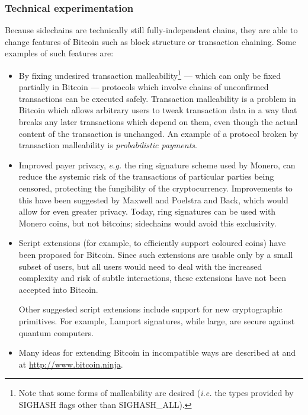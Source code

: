 \documentclass[letterpaper]{article}
\newcommand{\sidechains}{sidechains\xspace}
\begin{document}
\subsubsection{Technical experimentation}
Because \sidechains are technically still fully-independent chains, they
are able to change features of Bitcoin such as block structure or                              
transaction chaining. Some examples of such features are:                                      
\begin{itemize} 
\item By fixing undesired transaction malleability\footnote{Note that some forms of malleability are desired (\emph{i.e.} the types provided by SIGHASH flags other than SIGHASH\_ALL).} --- which can only be fixed partially in Bitcoin \cite{wuille2014} --- protocols which
involve chains of unconfirmed transactions can be executed safely. Transaction                 
malleability is a problem in Bitcoin which allows arbitrary users to tweak
transaction data in a way that breaks any later transactions which depend on
them, even though the actual content of the transaction is unchanged. An example               
of a protocol broken by transaction malleability is \emph{probabilistic                        
payments}\cite{caldwell2012}.                                                                  

\item Improved payer privacy, \emph{e.g.} the ring signature scheme used by Monero, can reduce the systemic risk of the
transactions of particular parties being censored, protecting the fungibility of the
cryptocurrency. Improvements to this have been suggested by Maxwell and Poelstra               
\cite{maxwell+poelstra2014, poelstra2014-2} and Back\cite{back2013-2}, which would allow for even greater privacy.
Today, ring signatures can be used with Monero coins, but not bitcoins; \sidechains would
avoid this exclusivity.

\item Script extensions (for example, to efficiently support coloured                           
coins\cite{jl20122013}) have been proposed for Bitcoin. Since such
extensions are usable only by a small subset of users, but all users                           
would need to deal with the increased complexity and risk of subtle                            
interactions, these extensions have not been accepted into Bitcoin.                            

Other suggested script extensions include support for new cryptographic                        
primitives. For example, Lamport signatures\cite{lamport1979}, while                           
large, are secure against quantum computers.                                                   

\item Many ideas for extending Bitcoin in incompatible ways are described                      
at \cite{maxwell2014} and at \url{http://www.bitcoin.ninja}.
\end{itemize}                                                                                  
\end{document}
